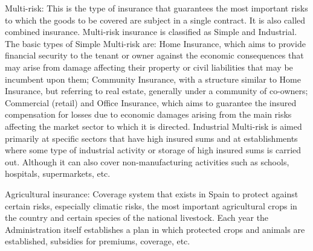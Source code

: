 \documentclass[review]{elsarticle}
\begin{document}
Multi-risk: This is the type of insurance that guarantees the most important risks to which the goods to be covered are subject in a single contract. It is also called combined insurance. Multi-risk insurance is classified as Simple and Industrial. The basic types of Simple Multi-risk are: Home Insurance, which aims to provide financial security to the tenant or owner against the economic consequences that may arise from damage affecting their property or civil liabilities that may be incumbent upon them; Community Insurance, with a structure similar to Home Insurance, but referring to real estate, generally under a community of co-owners; Commercial (retail) and Office Insurance, which aims to guarantee the insured compensation for losses due to economic damages arising from the main risks affecting the market sector to which it is directed. Industrial Multi-risk is aimed primarily at specific sectors that have high insured sums and at establishments where some type of industrial activity or storage of high insured sums is carried out. Although it can also cover non-manufacturing activities such as schools, hospitals, supermarkets, etc.

Agricultural insurance: Coverage system that exists in Spain to protect against certain risks, especially climatic risks, the most important agricultural crops in the country and certain species of the national livestock. Each year the Administration itself establishes a plan in which protected crops and animals are established, subsidies for premiums, coverage, etc.
\end{document}
